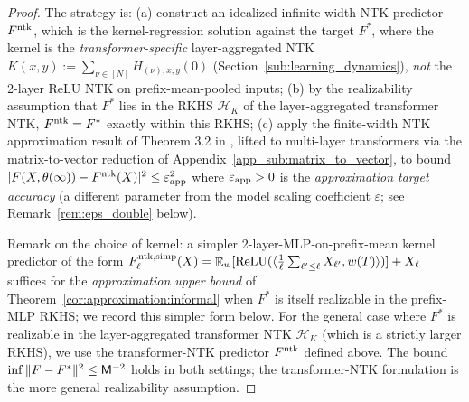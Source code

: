 \documentclass[11pt]{article}
\let\citet\citep
\theoremstyle{plain}
\DeclareMathOperator*{\E}{{\mathbb{E}}}
\begin{document}
\begin{proof}
    The strategy is: (a) construct an idealized infinite-width NTK predictor $F^{\rm ntk}$, which is the kernel-regression solution against the target $F^*$, where the kernel is the {\it transformer-specific} layer-aggregated NTK $K(x,y):=\sum_{\nu\in[N]}H_{(\nu),x,y}(0)$ (Section~\ref{sub:learning_dynamics}), {\it not} the 2-layer ReLU NTK on prefix-mean-pooled inputs; (b) by the realizability assumption that $F^*$ lies in the RKHS $\mathcal{H}_K$ of the layer-aggregated transformer NTK, $F^{\rm ntk} = F^*$ exactly within this RKHS; (c) apply the finite-width NTK approximation result of Theorem 3.2 in \citet{adh+19}, lifted to multi-layer transformers via the matrix-to-vector reduction of Appendix~\ref{app_sub:matrix_to_vector}, to bound $|F(X,\theta(\infty)) - F^{\rm ntk}(X)|^2 \leq \varepsilon_{\rm app}^2$ where $\varepsilon_{\rm app}>0$ is the {\it approximation target accuracy} (a different parameter from the model scaling coefficient $\varepsilon$; see Remark~\ref{rem:eps_double} below).

    Remark on the choice of kernel: a simpler 2-layer-MLP-on-prefix-mean kernel predictor of the form $F_\ell^{\rm ntk,simp}(X) = \E_w[{\rm ReLU}(\langle\frac{1}{\ell}\sum_{\ell'\le\ell}X_{\ell'}, w(T)\rangle)] + X_\ell$ suffices for the {\it approximation upper bound} of Theorem~\ref{cor:approximation:informal} when $F^*$ is itself realizable in the prefix-MLP RKHS; we record this simpler form below. For the general case where $F^*$ is realizable in the layer-aggregated transformer NTK $\mathcal{H}_K$ (which is a strictly larger RKHS), we use the transformer-NTK predictor $F^{\rm ntk}$ defined above. The bound $\inf\|F-F^*\|^2 \le {\sf M}^{-2}$ holds in both settings; the transformer-NTK formulation is the more general realizability assumption.


\end{proof}
\end{document}
